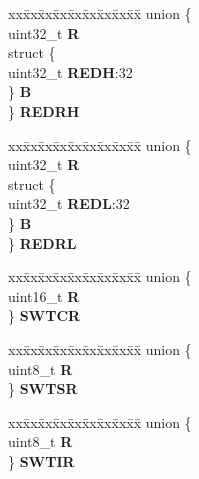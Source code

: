 \begin{DoxyCompactItemize}
\begin{tabbing}
\end{tabbing}\item 
\mbox{\label{structECSM__tag_ae75fbbbcb3157e049885dabcf4450a9b}} 
\begin{tabbing}
xx\=xx\=xx\=xx\=xx\=xx\=xx\=xx\=xx\=\kill
union \{\\
\>uint32\_t {\bfseries R}\\
\>struct \{\\
\>\>uint32\_t {\bfseries REDH}:32\\
\>\} {\bfseries B}\\
\} {\bfseries REDRH}\\

\end{tabbing}\item 
\mbox{\label{structECSM__tag_ad7559701c217e117309a64f62ecac9fb}} 
\begin{tabbing}
xx\=xx\=xx\=xx\=xx\=xx\=xx\=xx\=xx\=\kill
union \{\\
\>uint32\_t {\bfseries R}\\
\>struct \{\\
\>\>uint32\_t {\bfseries REDL}:32\\
\>\} {\bfseries B}\\
\} {\bfseries REDRL}\\

\end{tabbing}\item 
\mbox{\label{structECSM__tag_a0718336eabc1e0a7af22d1cf54eefb6e}} 
\begin{tabbing}
xx\=xx\=xx\=xx\=xx\=xx\=xx\=xx\=xx\=\kill
union \{\\
\>uint16\_t {\bfseries R}\\
\} {\bfseries SWTCR}\\

\end{tabbing}\item 
\mbox{\label{structECSM__tag_a1168a0fe09bd159639aab6142214d8d7}} 
\begin{tabbing}
xx\=xx\=xx\=xx\=xx\=xx\=xx\=xx\=xx\=\kill
union \{\\
\>uint8\_t {\bfseries R}\\
\} {\bfseries SWTSR}\\

\end{tabbing}\item 
\mbox{\label{structECSM__tag_a1aa881a163d3a7ecb4d5c145f39b3547}} 
\begin{tabbing}
xx\=xx\=xx\=xx\=xx\=xx\=xx\=xx\=xx\=\kill
union \{\\
\>uint8\_t {\bfseries R}\\
\} {\bfseries SWTIR}\\


\end{tabbing}
\end{DoxyCompactItemize}
